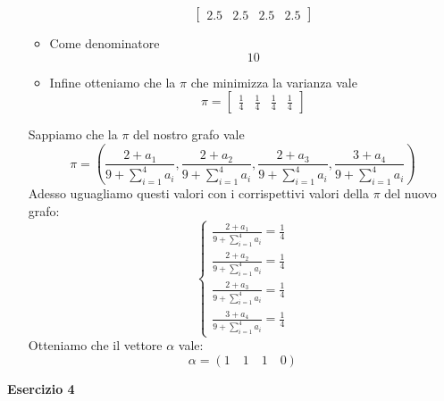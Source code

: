 \documentclass[a4paper,12pt]{article}
\begin{document}
\begin{itemize}
\begin{itemize}
			\[
			\begin{bmatrix}
				2.5 & 2.5 & 2.5 & 2.5
			\end{bmatrix}
			\]
			\item Come denominatore\\
			\[
			10
			\]
			\item Infine otteniamo che la $\pi$ che minimizza la varianza vale\\
			\[
			\pi=
			\begin{bmatrix}
				\frac{1}{4} & \frac{1}{4} & \frac{1}{4} & \frac{1}{4} 
			\end{bmatrix}
			\]
		\end{itemize}
		Sappiamo che la $\pi$ del nostro grafo vale\\
		\[
		\pi=(\frac{2+a_1}{9+\sum_{i=1}^4 a_i},\frac{2+a_2}{9+\sum_{i=1}^4 a_i},\frac{2+a_3}{9+\sum_{i=1}^4 a_i},\frac{3+a_4}{9+\sum_{i=1}^4 a_i})
		\]
		Adesso uguagliamo questi valori con i corrispettivi valori della $\pi$ del nuovo grafo:\\
		\[
		\begin{cases}
			\frac{2+a_1}{9+\sum_{i=1}^4 a_i}=\frac{1}{4}\\
			\frac{2+a_2}{9+\sum_{i=1}^4 a_i}=\frac{1}{4}\\
			\frac{2+a_3}{9+\sum_{i=1}^4 a_i}=\frac{1}{4}\\
			\frac{3+a_4}{9+\sum_{i=1}^4 a_i}=\frac{1}{4}
		\end{cases}
		\]
		Otteniamo che il vettore $\alpha$ vale:\\
		\[
		\alpha=(1\quad 1\quad 1\quad 0)
		\]
	\end{itemize}
	\centering \textbf{Esercizio 4}\\
\end{document}
